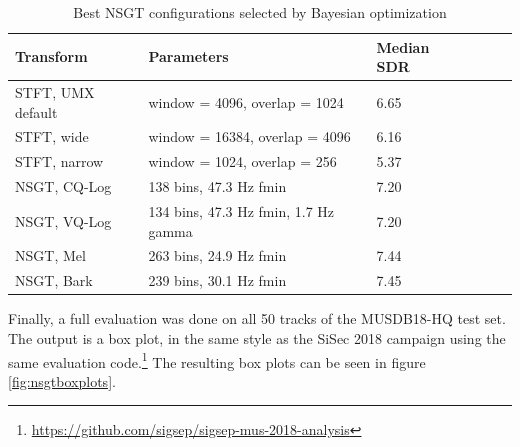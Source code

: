 \documentclass[report.tex]{subfiles}
\begin{document}
\begin{table}[ht]
	\centering
\begin{tabular}{ |l|l|l|c|c|c| }
	 \hline
	  Transform & Parameters & Median SDR \\
	 \hline
	 \hline
	 STFT, UMX default & window = 4096, overlap = 1024 & 6.65 \\
	 \hline
	 STFT, wide & window = 16384, overlap = 4096 & 6.16 \\
	 \hline
	 STFT, narrow & window = 1024, overlap = 256 & 5.37 \\
	 \hline
	 NSGT, CQ-Log & 138 bins, 47.3 Hz fmin & 7.20 \\
	 \hline
	 NSGT, VQ-Log & 134 bins, 47.3 Hz fmin, 1.7 Hz gamma & 7.20 \\
	 \hline
	 NSGT, Mel & 263 bins, 24.9 Hz fmin & 7.44 \\
	 \hline
	 NSGT, Bark & 239 bins, 30.1 Hz fmin & 7.45 \\
	 \hline
\end{tabular}
	\caption{Best NSGT configurations selected by Bayesian optimization}
	\label{table:nsgtbayesresults}
\end{table}

Finally, a full evaluation was done on all 50 tracks of the MUSDB18-HQ test set. The output is a box plot, in the same style as the SiSec 2018 campaign using the same evaluation code.\footnote{\href{https://github.com/sigsep/sigsep-mus-2018-analysis}{https://github.com/sigsep/sigsep-mus-2018-analysis}} The resulting box plots can be seen in figure \ref{fig:nsgtboxplots}.
\end{document}
